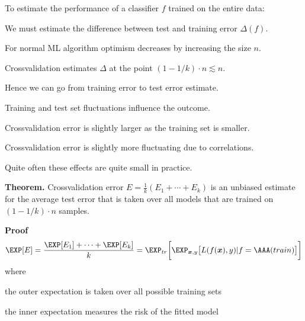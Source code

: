 \documentclass[landscape,footrule]{foils}
\begin{document}
To estimate the performance of a classifier $f$ trained on the entire data:
\begin{triangles}
\item We must estimate the difference between test and training error $\Delta(f)$.
\item For normal ML algorithm optimism decreases by increasing the size $n$.
\item Crossvalidation estimates $\Delta$ at the point $(1-1/k)\cdot n \lesssim n$. 
\item Hence we can go from training error to test error estimate.
\item Training and test set fluctuations influence the outcome.  
\end{triangles}
 


\vspace*{-.5cm}
\begin{triangles}
\item Crossvalidation error is slightly larger as the training set is smaller.  
\item Crossvalidation error is slightly more fluctuating due to correlations. 
\item Quite often these effects are quite small in practice. 
\end{triangles}

\foilhead[-1cm]{}



\textbf{Theorem.} 
Crossvalidation error $E =\frac{1}{k}(E_1+\cdots+E_k)$ is an 
unbiased estimate for the average test error that is taken over all models that are trained on $(1-1/k)\cdot n$ samples. 

\textbf{Proof}
\begin{align*}
\EXP[E] =\frac{\EXP[E_1]+\cdots+\EXP[E_k]}{k}=\EXP_{tr}\biggl[\EXP_{\vec{x}, y}\bigl[L(f(\vec{x}),y)|f=\AAA(train)\bigr]\biggr]
\end{align*}
where 
\begin{triangles}
\item the outer expectation is taken over all possible training sets  
\item the inner expectation measures the risk of the fitted model
\end{triangles}


\end{document}
